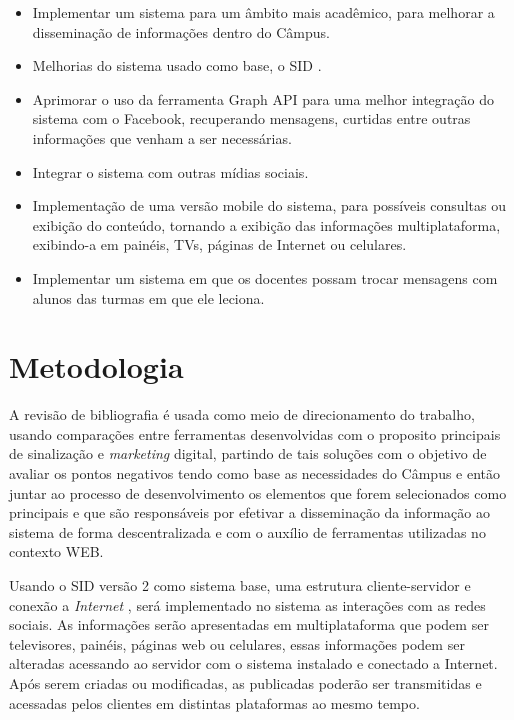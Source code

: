 	 \begin{itemize}
	\item Implementar um sistema para um âmbito mais acadêmico, para melhorar a disseminação de informações dentro do Câmpus.
	 	
	\item Melhorias do sistema usado como base, o SID \cite{sobrinho2017}.
	
	\item Aprimorar o uso da ferramenta Graph API para uma melhor integração do sistema com o Facebook, recuperando mensagens, curtidas entre outras informações que venham a ser necessárias.
	
	\item Integrar o sistema com outras mídias sociais.
	
	\item Implementação de uma versão mobile do sistema, para possíveis consultas ou exibição do conteúdo, tornando a exibição das informações multiplataforma, exibindo-a em painéis, TVs, páginas de Internet ou celulares.
	
	\item  Implementar um sistema em que os docentes possam trocar mensagens com alunos das turmas em que ele leciona.
	\end{itemize}
\section{Metodologia}
A revisão de bibliografia é usada como meio de direcionamento do trabalho, usando comparações entre ferramentas desenvolvidas com o proposito principais de sinalização e \textit{marketing} digital, partindo de tais soluções com o objetivo de avaliar os pontos negativos tendo como base as necessidades do Câmpus e então juntar ao processo de desenvolvimento os elementos que forem selecionados como principais e que são responsáveis por efetivar a disseminação da informação ao sistema de forma descentralizada e com o auxílio de ferramentas utilizadas no contexto WEB.
	 
Usando o SID versão 2 como sistema base, uma estrutura cliente-servidor e conexão a \textit{Internet} , será implementado no sistema as interações com as redes sociais. As informações serão apresentadas em multiplataforma que podem ser televisores, painéis, páginas web ou celulares, essas informações podem ser alteradas acessando ao servidor com o sistema instalado e conectado a Internet. Após serem criadas ou modificadas, as publicadas poderão ser transmitidas e acessadas pelos clientes em distintas plataformas ao mesmo tempo.

